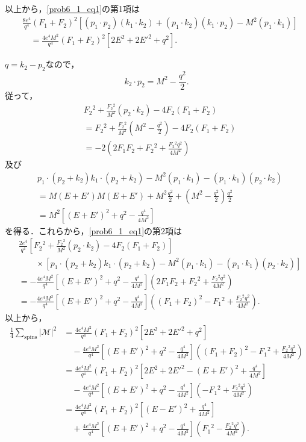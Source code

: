 以上から，\eqref{prob6_1_eq1}の第1項は
\begin{align*}
  &  \frac{8e^4}{q^4}
  (F_1 + F_2)^2 [(p_1 \cdot p_2)(k_1 \cdot k_2) + (p_1 \cdot k_2)(k_1 \cdot p_2) - M^2(p_1 \cdot k_1) ] \\
  & \quad = \frac{4e^4M^2}{q^4} (F_1 + F_2)^2 [2E^2 + 2E'^2 + q^2] .
\end{align*}

$q = k_2 - p_2$なので，
\[ k_2 \cdot p_2 = M^2 - \frac{q^2}{2} . \]
従って，
\begin{align*}
  & F_2{}^2 + \frac{F_2{}^2}{M^2} (p_2 \cdot k_2) - 4F_2(F_1 + F_2) \\
  &= F_2{}^2 + \frac{F_2{}^2}{M^2} \left( M^2 - \frac{q^2}{2} \right) - 4F_2(F_1 + F_2) \\
  &= -2 \left( 2F_1F_2 + F_2{}^2 + \frac{F_2{}^2q^2}{4M^2} \right)
\end{align*}
及び
\begin{align*}
  & p_1 \cdot (p_2 + k_2) k_1 \cdot (p_2 + k_2) - M^2(p_1 \cdot k_1) - (p_1 \cdot k_1)(p_2 \cdot k_2) \\
  &= M (E + E') M (E + E') + M^2 \frac{q^2}{2} + \left( M^2 - \frac{q^2}{2} \right) \frac{q^2}{2} \\
  &= M^2 \left[ (E + E')^2 + q^2 - \frac{q^4}{4M^2} \right]
\end{align*}
を得る．これらから，\eqref{prob6_1_eq1}の第2項は
\begin{align*}
  & \frac{2e^4}{q^4} \left[ F_2{}^2 + \frac{F_2{}^2}{M^2} (p_2 \cdot k_2) - 4F_2(F_1 + F_2) \right] \\
  & \qquad \times [ p_1 \cdot (p_2 + k_2) k_1 \cdot (p_2 + k_2) - M^2(p_1 \cdot k_1) - (p_1 \cdot k_1)(p_2 \cdot k_2) ] \\
  &= - \frac{4e^4M^2}{q^4} \left[ (E + E')^2 + q^2 - \frac{q^4}{4M^2} \right] \left( 2F_1F_2 + F_2{}^2 + \frac{F_2{}^2q^2}{4M^2} \right) \\
  &= - \frac{4e^4M^2}{q^4} \left[ (E + E')^2 + q^2 - \frac{q^4}{4M^2} \right] \left( (F_1 + F_2)^2 - F_1{}^2 + \frac{F_2{}^2q^2}{4M^2} \right) .
\end{align*}
以上から，
\begin{align*}
  \frac{1}{4}\sum_\text{spins}\lvert\mathcal{M}\rvert^2 &= \frac{4e^4M^2}{q^4} (F_1 + F_2)^2 [2E^2 + 2E'^2 + q^2] \\
  & \quad - \frac{4e^4M^2}{q^4} \left[ (E + E')^2 + q^2 - \frac{q^4}{4M^2} \right] \left( (F_1 + F_2)^2 - F_1{}^2 + \frac{F_2{}^2q^2}{4M^2} \right) \\
  &= \frac{4e^4M^2}{q^4} (F_1 + F_2)^2 \left[ 2E^2 + 2E'^2 - (E + E')^2 + \frac{q^4}{4M^2} \right] \\
  & \quad - \frac{4e^4M^2}{q^4} \left[ (E + E')^2 + q^2 - \frac{q^4}{4M^2} \right] \left( - F_1{}^2 + \frac{F_2{}^2q^2}{4M^2} \right) \\
  &= \frac{4e^4M^2}{q^4} (F_1 + F_2)^2 \left[ (E - E')^2 + \frac{q^4}{4M^2} \right] \\
  & \quad + \frac{4e^4M^2}{q^4} \left[ (E + E')^2 + q^2 - \frac{q^4}{4M^2} \right] \left( F_1{}^2 - \frac{F_2{}^2q^2}{4M^2} \right) .
\end{align*}
